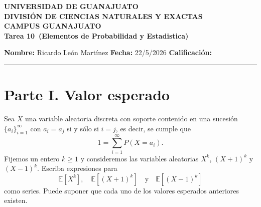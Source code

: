 \documentclass[12pt,a4paper]{article}
\newcommand{\alumno}{Ricardo León Martínez}
\newcommand{\materia}{Elementos de Probabilidad y Estadistica}
\newcommand{\tarea}{Tarea 10}
\newcommand{\fecha}{22/5/2026}
\begin{document}
    \begin{center}
        {\large\textbf{UNIVERSIDAD DE GUANAJUATO}}\\[0.3cm]
        {\normalsize\textbf{DIVISIÓN DE CIENCIAS NATURALES Y EXACTAS}}\\
        {\normalsize\textbf{CAMPUS GUANAJUATO}}\\[1cm]

        {\Large\textbf{\tarea\ (\materia)}}\\[1cm]
    \end{center}

    \noindent
    \textbf{Nombre:} \alumno 
    \hfill 
    \textbf{Fecha:} \fecha 
    \hfill 
    \textbf{Calificación:} \rule{3cm}{0.4pt}

    \vspace{0.3cm}

    \section*{Parte I. Valor esperado}

    \begin{mdframed}[style=mdpinkbox, frametitle={Ejercicio 1}]
        Sea $X$ una variable aleatoria discreta con soporte contenido en una sucesión $\{a_i\}_{i=1}^{\infty}$
        con $a_i = a_j$ si y sólo si $i = j$, es decir, se cumple que
        \begin{equation*}
            1 = \sum_{i=1}^{\infty} P(X = a_i).
        \end{equation*}
        Fijemos un entero $k \geq 1$ y consideremos las variables aleatorias $X^k$, $(X+1)^k$ y $(X-1)^k$.
        Escriba expresiones para
        \begin{equation*}
            \mathbb{E}[X^k], \quad \mathbb{E}[(X+1)^k] \quad \text{y} \quad \mathbb{E}[(X-1)^k]
        \end{equation*}
        como series. Puede suponer que cada uno de los valores esperados anteriores existen.
    \end{mdframed}
\end{document}
